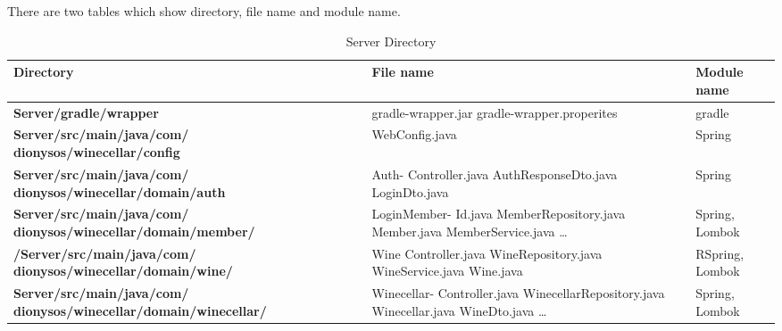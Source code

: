 \documentclass[conference]{IEEEtran}
\numberwithin{figure}{subsection}
\begin{document}
There are two tables which show directory, file name and module name. 
\begin{table}[htbp!]
\caption{Server Directory}
    \begin{center}
        \begin{tabular}{ | m{3cm} | m{2cm}| m{1.5cm} | } 
          \hline
         \textbf{Directory}& \textbf{File name} & \textbf{Module name} \\
        \hline
          \textbf{Server/gradle/wrapper} & gradle-wrapper.jar
        gradle-wrapper.properites
         & gradle\\
          \hline
          \textbf{Server/src/main/java/com/
          dionysos/winecellar/config} & WebConfig.java
         & Spring \\ 
          \hline
          \textbf{Server/src/main/java/com/
          dionysos/winecellar/domain/auth} & Auth-
          Controller.java
        AuthResponseDto.java
        LoginDto.java
        
         & Spring\\
          \hline
         \textbf{Server/src/main/java/com/
         dionysos/winecellar/domain/member/}& LoginMember-
         Id.java
        MemberRepository.java
        Member.java
        MemberService.java
        …
        
        & Spring,
        Lombok
         \\
        \hline
          \textbf{/Server/src/main/java/com/
          dionysos/winecellar/domain/wine/} & Wine
          Controller.java
        WineRepository.java
        WineService.java
        Wine.java
        
         & RSpring,
        Lombok
         \\
          \hline
          \textbf{Server/src/main/java/com/
          dionysos/winecellar/domain/winecellar/} & Winecellar-
          Controller.java
        WinecellarRepository.java
        Winecellar.java
        WineDto.java
        …
        
         & Spring,
        Lombok
        \\
          \hline
        \end{tabular}
    \end{center}
\end{table}
\end{document}
